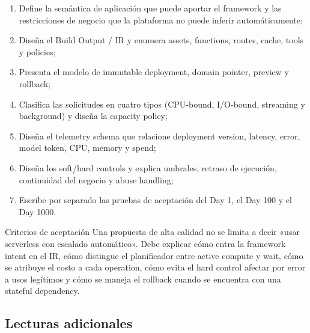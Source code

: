 \documentclass[a4paper]{article}
\begin{document}
\begin{enumerate}
  \item Define la semántica de aplicación que puede aportar el framework y las restricciones de negocio que la plataforma no puede inferir automáticamente;
  \item Diseña el Build Output / IR y enumera assets, functions, routes, cache, tools y policies;
  \item Presenta el modelo de immutable deployment, domain pointer, preview y rollback;
  \item Clasifica las solicitudes en cuatro tipos (CPU-bound, I/O-bound, streaming y background) y diseña la capacity policy;
  \item Diseña el telemetry schema que relacione deployment version, latency, error, model token, CPU, memory y spend;
  \item Diseña los soft/hard controls y explica umbrales, retraso de ejecución, continuidad del negocio y abuse handling;
  \item Escribe por separado las pruebas de aceptación del Day 1, el Day 100 y el Day 1000.
\end{enumerate}

\begin{knowledgebox}{Criterios de aceptación}
Una propuesta de alta calidad no se limita a decir «usar serverless con escalado automático». Debe explicar cómo entra la framework intent en el IR, cómo distingue el planificador entre active compute y wait, cómo se atribuye el costo a cada operation, cómo evita el hard control afectar por error a usos legítimos y cómo se maneja el rollback cuando se encuentra con una stateful dependency.
\end{knowledgebox}

\subsection{Lecturas adicionales}
\end{document}
